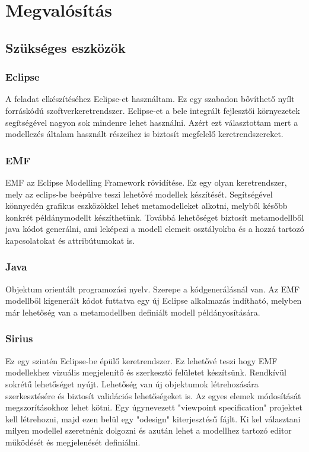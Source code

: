 \chapter{Megvalósítás}
\section{Szükséges eszközök}
\subsection{Eclipse}
A feladat elkészítéséhez Eclipse-et használtam. Ez egy szabadon bővíthető nyílt forráskódú szoftverkeretrendszer. Eclipse-et a bele integrált fejlesztői környezetek segítségével nagyon sok mindenre lehet használni. Azért ezt választottam mert a modellezés általam használt részeihez is biztosít megfelelő keretrendszereket.
\subsection{EMF}
EMF az Eclipse Modelling Framework rövidítése. Ez egy olyan keretrendszer, mely az eclips-be beépülve teszi lehetővé modellek készítését. Segítségével könnyedén grafikus eszközökkel lehet metamodelleket alkotni, melyből később konkrét példánymodellt készíthetünk. Továbbá lehetőséget biztosít metamodellből java kódot generálni, ami leképezi a modell elemeit osztályokba és a hozzá tartozó kapcsolatokat és attribútumokat is.
\subsection{Java}
Objektum orientált programozási nyelv. Szerepe a kódgenerálásnál van. Az EMF modellből kigenerált kódot futtatva egy új Eclipse alkalmazás indítható, melyben már lehetőség van a metamodellben definiált modell példányosítására.
\subsection{Sirius}
Ez egy szintén Eclipse-be épülő keretrendszer. Ez lehetővé teszi hogy EMF modellekhez vizuális megjelenítő és szerkesztő felületet készítsünk. Rendkívül sokrétű lehetőséget nyújt. Lehetőség van új objektumok létrehozására szerkesztésére és biztosít validációs lehetőségeket is. Az egyes elemek módosítását megszorításokhoz lehet kötni. Egy úgynevezett "viewpoint specification" projektet kell létrehozni, majd ezen belül egy "odesign" kiterjesztésű fájlt. Ki kel választani milyen modellel szeretnénk dolgozni és azután lehet a modellhez tartozó editor működését és megjelenését definiálni.
